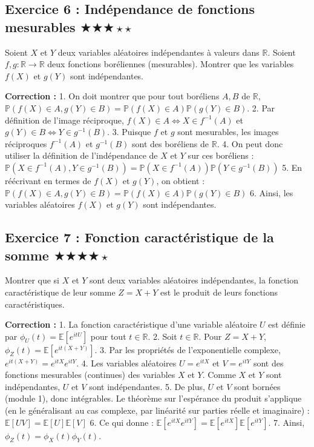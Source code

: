 \documentclass[11pt,a4paper]{article}
\begin{document}
\subsection*{Exercice 6 : Indépendance de fonctions mesurables \quad $\bigstar\bigstar\bigstar\star\star$}

Soient $X$ et $Y$ deux variables aléatoires indépendantes à valeurs dans $\mathbb{R}$. Soient $f, g : \mathbb{R} \to \mathbb{R}$ deux fonctions boréliennes (mesurables). Montrer que les variables $f(X)$ et $g(Y)$ sont indépendantes.

\textbf{Correction :}
1. On doit montrer que pour tout boréliens $A, B$ de $\mathbb{R}$, $\mathbb{P}(f(X) \in A, g(Y) \in B) = \mathbb{P}(f(X) \in A)\mathbb{P}(g(Y) \in B)$.
2. Par définition de l'image réciproque, $f(X) \in A \iff X \in f^{-1}(A)$ et $g(Y) \in B \iff Y \in g^{-1}(B)$.
3. Puisque $f$ et $g$ sont mesurables, les images réciproques $f^{-1}(A)$ et $g^{-1}(B)$ sont des boréliens de $\mathbb{R}$.
4. On peut donc utiliser la définition de l'indépendance de $X$ et $Y$ sur ces boréliens :
   $\mathbb{P}(X \in f^{-1}(A), Y \in g^{-1}(B)) = \mathbb{P}(X \in f^{-1}(A))\mathbb{P}(Y \in g^{-1}(B))$
5. En réécrivant en termes de $f(X)$ et $g(Y)$, on obtient :
   $\mathbb{P}(f(X) \in A, g(Y) \in B) = \mathbb{P}(f(X) \in A)\mathbb{P}(g(Y) \in B)$
6. Ainsi, les variables aléatoires $f(X)$ et $g(Y)$ sont indépendantes.

\subsection*{Exercice 7 : Fonction caractéristique de la somme \quad $\bigstar\bigstar\bigstar\bigstar\star$}

Montrer que si $X$ et $Y$ sont deux variables aléatoires indépendantes, la fonction caractéristique de leur somme $Z = X + Y$ est le produit de leurs fonctions caractéristiques.

\textbf{Correction :}
1. La fonction caractéristique d'une variable aléatoire $U$ est définie par $\phi_U(t) = \mathbb{E}[e^{itU}]$ pour tout $t \in \mathbb{R}$.
2. Soit $t \in \mathbb{R}$. Pour $Z = X+Y$, $\phi_Z(t) = \mathbb{E}[e^{it(X+Y)}]$.
3. Par les propriétés de l'exponentielle complexe, $e^{it(X+Y)} = e^{itX} e^{itY}$.
4. Les variables aléatoires $U = e^{itX}$ et $V = e^{itY}$ sont des fonctions mesurables (continues) des variables $X$ et $Y$. Comme $X$ et $Y$ sont indépendantes, $U$ et $V$ sont indépendantes.
5. De plus, $U$ et $V$ sont bornées (module 1), donc intégrables. Le théorème sur l'espérance du produit s'applique (en le généralisant au cas complexe, par linéarité sur parties réelle et imaginaire) :
   $\mathbb{E}[UV] = \mathbb{E}[U]\mathbb{E}[V]$
6. Ce qui donne : $\mathbb{E}[e^{itX} e^{itY}] = \mathbb{E}[e^{itX}]\mathbb{E}[e^{itY}]$.
7. Ainsi, $\phi_Z(t) = \phi_X(t)\phi_Y(t)$.
\end{document}
